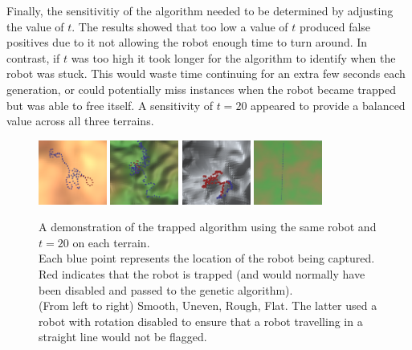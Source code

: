 \documentclass{article}
\begin{document}
Finally, the sensitivitiy of the algorithm needed to be determined by adjusting the value of $t$. The results showed that too low a value of $t$ produced false positives due to it not allowing the robot enough time to turn around. In contrast, if $t$ was too high it took longer for the algorithm to identify when the robot was stuck. This would waste time continuing for an extra few seconds each generation, or could potentially miss instances when the robot became trapped but was able to free itself. A sensitivity of $t=20$ appeared to provide a balanced value across all three terrains.

\begin{figure}[H]
\centering
\includegraphics[width=0.2\textwidth]{trappedSmooth}
\includegraphics[width=0.2\textwidth]{trappedUneven}
\includegraphics[width=0.2\textwidth]{trappedRough}
\includegraphics[width=0.2\textwidth]{trappedFlat}
\caption{A demonstration of the trapped algorithm using the same robot and $t=20$ on each terrain.\\
Each blue point represents the location of the robot being captured. Red indicates that the robot is trapped (and would normally have been disabled and passed to the genetic algorithm).\\ 
(From left to right) Smooth, Uneven, Rough, Flat. The latter used a robot with rotation disabled to ensure that a robot travelling in a straight line would not be flagged.}
\label{fig:trappedPoints}
\end{figure}
\end{document}
